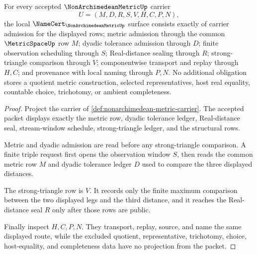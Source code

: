 \begin{theorem}
\label{thm:nonarchimedean-metric-namecert-obligations}
For every accepted $\NonArchimedeanMetricUp$ carrier
$$
U=(M,D,R,S,V,H,C,P,N),
$$
the local $\NameCert_{\NonArchimedeanMetricUp}$ surface consists exactly of carrier admission for the displayed rows; metric admission through the common $\MetricSpaceUp$ row $M$; dyadic tolerance admission through $D$; finite observation scheduling through $S$; Real-distance sealing through $R$; strong-triangle comparison through $V$; componentwise transport and replay through $H,C$; and provenance with local naming through $P,N$. No additional obligation stores a quotient metric construction, selected representatives, host real equality, countable choice, trichotomy, or ambient completeness.
\end{theorem}
\begin{proof}
Project the carrier of \autoref{def:nonarchimedean-metric-carrier}. The accepted packet displays exactly the metric row, dyadic tolerance ledger, Real-distance seal, stream-window schedule, strong-triangle ledger, and the structural rows.

Metric and dyadic admission are read before any strong-triangle comparison. A finite triple request first opens the observation window $S$, then reads the common metric row $M$ and dyadic tolerance ledger $D$ used to compare the three displayed distances.

The strong-triangle row is $V$. It records only the finite maximum comparison between the two displayed legs and the third distance, and it reaches the Real-distance seal $R$ only after those rows are public.

Finally inspect $H,C,P,N$. They transport, replay, source, and name the same displayed route, while the excluded quotient, representative, trichotomy, choice, host-equality, and completeness data have no projection from the packet.
\end{proof}

